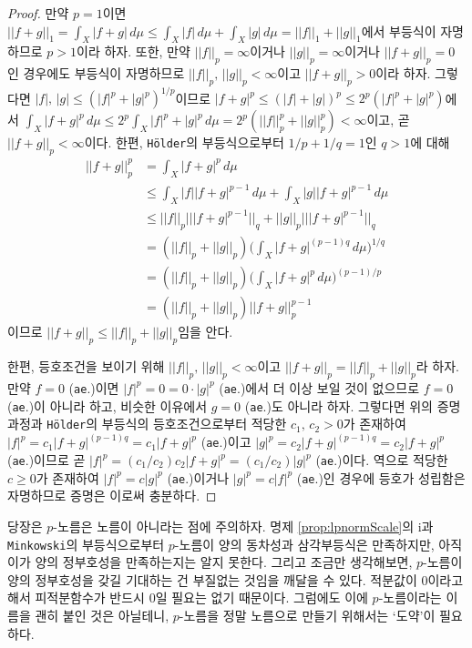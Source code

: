 \begin{proof}
    만약 $p=1$이면 $||f+g||_1=\int_X|f+g|\,d\mu\leq\int_X|f|\,d\mu+\int_X|g|\,d\mu=||f||_1+||g||_1$에서 부등식이 자명하므로 $p>1$이라 하자. 또한, 만약 $||f||_p=\infty$이거나 $||g||_p=\infty$이거나 $||f+g||_p=0$인 경우에도 부등식이 자명하므로 $||f||_p,\,||g||_p<\infty$이고 $||f+g||_p>0$이라 하자. 그렇다면 $|f|,\,|g|\leq(|f|^p+|g|^p)^{1/p}$이므로 $|f+g|^p\leq(|f|+|g|)^p\leq2^p(|f|^p+|g|^p)$에서 $\int_X|f+g|^p\,d\mu\leq2^p\int_X|f|^p+|g|^p\,d\mu=2^p(||f||_p^p+||g||_p^p)<\infty$이고, 곧 $||f+g||_p<\infty$이다. 한편, \texttt{H\"older}의 부등식으로부터 $1/p+1/q=1$인 $q>1$에 대해
    \begin{align*}
        ||f+g||_p^p&=\int_X|f+g|^p\,d\mu\\
        &\leq\int_X|f||f+g|^{p-1}\,d\mu+\int_X|g||f+g|^{p-1}\,d\mu\\
        &\leq||f||_p|||f+g|^{p-1}||_q+||g||_p|||f+g|^{p-1}||_q\\
        &=(||f||_p+||g||_p)\bigg(\int_X|f+g|^{(p-1)q}\,d\mu\bigg)^{1/q}\\
        &=(||f||_p+||g||_p)\bigg(\int_X|f+g|^p\,d\mu\bigg)^{(p-1)/p}\\
        &=(||f||_p+||g||_p)||f+g||_p^{p-1}
    \end{align*}
    이므로 $||f+g||_p\leq||f||_p+||g||_p$임을 안다.

    한편, 등호조건을 보이기 위해 $||f||_p,\,||g||_p<\infty$이고 $||f+g||_p=||f||_p+||g||_p$라 하자. 만약 $f=0$ (\texttt{ae}.)이면 $|f|^p=0=0\cdot|g|^p$ (\texttt{ae}.)에서 더 이상 보일 것이 없으므로 $f=0$ (\texttt{ae}.)이 아니라 하고, 비슷한 이유에서 $g=0$ (\texttt{ae}.)도 아니라 하자. 그렇다면 위의 증명과정과 \texttt{H\"older}의 부등식의 등호조건으로부터 적당한 $c_1,\,c_2>0$가 존재하여 $|f|^p=c_1|f+g|^{(p-1)q}=c_1|f+g|^p$ (\texttt{ae}.)이고 $|g|^p=c_2|f+g|^{(p-1)q}=c_2|f+g|^p$ (\texttt{ae}.)이므로 곧 $|f|^p=(c_1/c_2)c_2|f+g|^p=(c_1/c_2)|g|^p$ (\texttt{ae}.)이다. 역으로 적당한 $c\geq0$가 존재하여 $|f|^p=c|g|^p$ (\texttt{ae}.)이거나 $|g|^p=c|f|^p$ (\texttt{ae}.)인 경우에 등호가 성립함은 자명하므로 증명은 이로써 충분하다.
\end{proof}

당장은 $p$-노름은 노름이 아니라는 점에 주의하자. 명제 \ref{prop:lpnormScale}의 i과 \texttt{Minkowski}의 부등식으로부터 $p$-노름이 양의 동차성과 삼각부등식은 만족하지만, 아직 이가 양의 정부호성을 만족하는지는 알지 못한다. 그리고 조금만 생각해보면, $p$-노름이 양의 정부호성을 갖길 기대하는 건 부질없는 것임을 깨달을 수 있다. 적분값이 0이라고 해서 피적분함수가 반드시 0일 필요는 없기 때문이다. 그럼에도 이에 $p$-노름이라는 이름을 괜히 붙인 것은 아닐테니, $p$-노름을 정말 노름으로 만들기 위해서는 `도약'이 필요하다.

